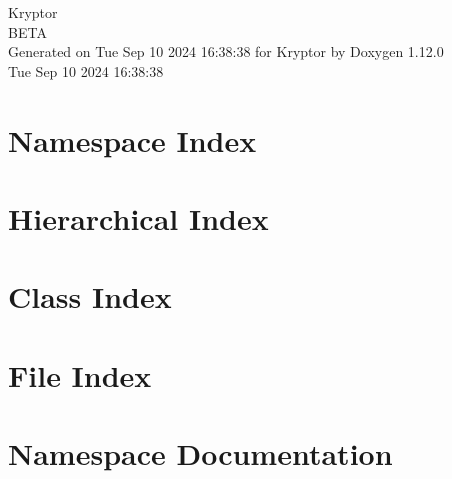 \documentclass[twoside]{book}
\newcommand{\+}{\discretionary{\mbox{\scriptsize$\hookleftarrow$}}{}{}}
\newcommand{\clearemptydoublepage}{%
    \newpage{\pagestyle{empty}\cleardoublepage}%
  }
\begin{document}
  \raggedbottom
    \hypersetup{pageanchor=false,
                bookmarksnumbered=true,
                pdfencoding=unicode
               }
  \begin{titlepage}
  \vspace*{7cm}
  \begin{center}%
  {\Large Kryptor}\\
  [1ex]\large BETA \\
  \vspace*{1cm}
  {\large Generated on Tue Sep 10 2024 16\+:38\+:38 for Kryptor by Doxygen 1.12.0}\\
    \vspace*{0.5cm}
    {\small Tue Sep 10 2024 16:38:38}
  \end{center}
  \end{titlepage}
  \clearemptydoublepage
  \tableofcontents
  \clearemptydoublepage
  \hypersetup{pageanchor=true}





\chapter{Namespace Index}

\chapter{Hierarchical Index}

\chapter{Class Index}

\chapter{File Index}

\chapter{Namespace Documentation}











\end{document}
